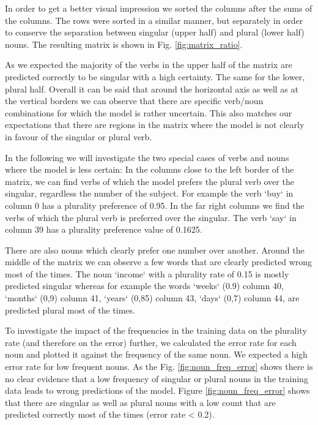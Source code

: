 In order to get a better visual impression we sorted the columns after the sums of the columns. The rows were sorted in a similar manner, but separately in order to conserve the separation between singular (upper half) and plural (lower half) nouns. The resulting matrix is shown in Fig. \ref{fig:matrix_ratio}.

As we expected the majority of the verbs in the upper half of the matrix are predicted correctly to be singular with a high certainty. The same for the lower, plural half. Overall it can be said that around the horizontal axis as well as at the vertical borders we can observe that there are specific verb/noun combinations for which the model is rather uncertain. This also matches our expectations that there are regions in the matrix where the model is not clearly in favour of the singular or plural verb. 

In the following we will investigate the two special cases of verbs and nouns where the model is less certain: 
In the columns close to the left border of the matrix, we can find verbs of which the model prefers the plural verb over the singular, regardless the number of the subject. For example the verb `buy` in column 0 has a plurality preference of 0.95. In the far right columns we find the verbs of which the plural verb is preferred over the singular. The verb `say` in column 39 has a plurality preference value of 0.1625.

There are also nouns which clearly prefer one number over another. Around the middle of the matrix we can observe a few words that are clearly predicted wrong most of the times. The noun `income` with a plurality rate of 0.15 is mostly predicted singular whereas for example the words `weeks` (0.9) column 40, `months` (0,9) column 41, `years` (0,85) column 43, `days` (0,7) column 44, are predicted plural most of the times.

    
To investigate the impact of the frequencies in the training data on the plurality rate (and therefore on the error) further, we calculated the error rate for each noun and plotted it against the frequency of the same noun. We expected a high error rate for low frequent nouns. As the Fig. \ref{fig:noun_freq_error} shows there is no clear evidence that a low frequency of singular or plural nouns in the training data leads to wrong predictions of the model. Figure \ref{fig:noun_freq_error} shows that there are singular as well as plural nouns with a low count that are predicted correctly most of the times (error rate < 0.2).


